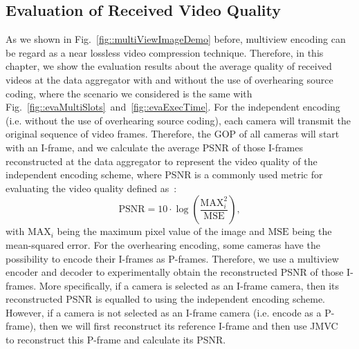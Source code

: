 \subsection{Evaluation of Received Video Quality}
As we shown in Fig.~\ref{fig::multiViewImageDemo} before, multiview encoding can be regard as a near lossless video compression technique.
Therefore, in this chapter, we show the evaluation results about the average quality of received videos at the data aggregator with and without the use of overhearing source coding, where the scenario we considered is the same with Fig.~\ref{fig::evaMultiSlots}~and~\ref{fig::evaExecTime}.
For the independent encoding (i.e. without the use of overhearing source coding), each camera will transmit the original sequence of video frames.
Therefore, the GOP of all cameras will start with an I-frame, and we calculate the average PSNR of those I-frames reconstructed at the data aggregator to represent the video quality of the independent encoding scheme, where PSNR is a commonly used metric for evaluating the video quality defined as~\cite{PSNRDef}:
\begin{equation}
\text{PSNR} = 10 \cdot \log \left( \frac{\text{MAX}^2_i}{\text{MSE}} \right),
\end{equation}
with $\text{MAX}_i$ being the maximum pixel value of the image and $\text{MSE}$ being the mean-squared error.
%
For the overhearing encoding, some cameras have the possibility to encode their I-frames as P-frames.
Therefore, we use a multiview encoder and decoder to experimentally obtain the reconstructed PSNR of those I-frames.
More specifically, if a camera is selected as an I-frame camera, then its reconstructed PSNR is equalled to using the independent encoding scheme.
However, if a camera is not selected as an I-frame camera (i.e. encode as a P-frame), then we will first reconstruct its reference I-frame and then use JMVC~\cite{JMVC} to reconstruct this P-frame and calculate its PSNR.

